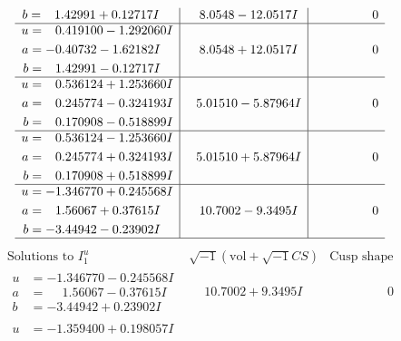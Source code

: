 \documentclass[1p]{elsarticle_modified}
\theoremstyle{definition}
\newcommand{\I}{\sqrt{-1}}
\begin{document}
$$\begin{array}{c|c|c}
\begin{aligned}
b &= \phantom{-}1.42991 + 0.12717 I\end{aligned}
 & \phantom{-}8.0548 - 12.0517 I & \phantom{-0.000000 } 0 \\ \hline\begin{aligned}
u &= \phantom{-}0.419100 - 1.292060 I \\
a &= -0.40732 - 1.62182 I \\
b &= \phantom{-}1.42991 - 0.12717 I\end{aligned}
 & \phantom{-}8.0548 + 12.0517 I & \phantom{-0.000000 } 0 \\ \hline\begin{aligned}
u &= \phantom{-}0.536124 + 1.253660 I \\
a &= \phantom{-}0.245774 - 0.324193 I \\
b &= \phantom{-}0.170908 - 0.518899 I\end{aligned}
 & \phantom{-}5.01510 - 5.87964 I & \phantom{-0.000000 } 0 \\ \hline\begin{aligned}
u &= \phantom{-}0.536124 - 1.253660 I \\
a &= \phantom{-}0.245774 + 0.324193 I \\
b &= \phantom{-}0.170908 + 0.518899 I\end{aligned}
 & \phantom{-}5.01510 + 5.87964 I & \phantom{-0.000000 } 0 \\ \hline\begin{aligned}
u &= -1.346770 + 0.245568 I \\
a &= \phantom{-}1.56067 + 0.37615 I \\
b &= -3.44942 - 0.23902 I\end{aligned}
 & \phantom{-}10.7002 - 9.3495 I & \phantom{-0.000000 } 0\\
 \hline 
 \end{array}$$\newpage$$\begin{array}{c|c|c}  
\text{Solutions to }I^u_{1}& \I (\text{vol} + \sqrt{-1}CS) & \text{Cusp shape}\\
 \hline 
\begin{aligned}
u &= -1.346770 - 0.245568 I \\
a &= \phantom{-}1.56067 - 0.37615 I \\
b &= -3.44942 + 0.23902 I\end{aligned}
 & \phantom{-}10.7002 + 9.3495 I & \phantom{-0.000000 } 0 \\ \hline\begin{aligned}
u &= -1.359400 + 0.198057 I \\

\end{aligned}
\end{array}$$
\end{document}
